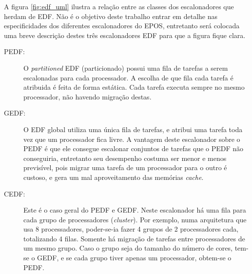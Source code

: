 A figura \ref{fig:edf_uml} ilustra a relação entre as classes dos escalonadores que herdam de EDF.  Não é o objetivo deste trabalho entrar em detalhe nas especificidades dos diferentes escalonadores do EPOS, entretanto será colocada uma breve descrição destes três escalonadores EDF para que a figura fique clara.

\begin{description}

\item[PEDF:] O \emph{partitioned} EDF (particionado) possui uma fila de tarefas a serem escalonadas para cada processador. A escolha de que fila cada tarefa é atribuida é feita de forma estática. Cada tarefa executa sempre no mesmo processador, não havendo migração destas. 

\item[GEDF:] O EDF global utiliza uma única fila de tarefas, e atribui uma tarefa toda vez que um processador fica livre. A vantagem deste escalonador sobre o PEDF é que ele consegue escalonar conjuntos de tarefas que o PEDF não conseguiria, entretanto seu desempenho costuma ser menor e menos previsível, pois migrar uma tarefa de um processador para o outro é custoso, e gera um mal aproveitamento das memórias \emph{cache}.

\item[CEDF:] Este é o caso geral do PEDF e GEDF. Neste escalonador há uma fila para cada grupo de processadores (\emph{cluster}). Por exemplo, numa arquitetura que usa 8 processadores, poder-se-ia fazer 4 grupos de 2 processadores cada, totalizando 4 filas. Somente há migração de tarefas entre processadores de um mesmo grupo. Caso o grupo seja do tamanho do número de cores, tem-se o GEDF, e se cada grupo tiver apenas um processador, obtem-se o PEDF.

\end{description}
